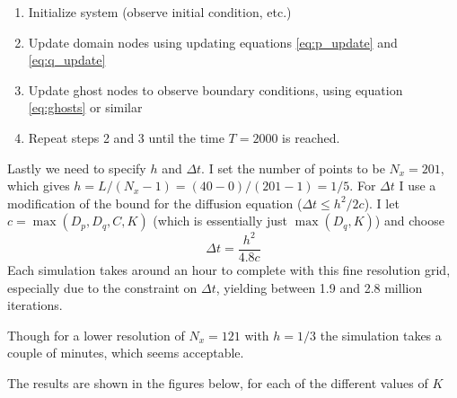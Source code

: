 \documentclass[a4paper,10pt]{article}
\begin{document}
	\begin{enumerate}
		\item Initialize system (observe initial condition, etc.)
		\item Update domain nodes using updating equations \ref{eq:p_update} and \ref{eq:q_update}
		\item Update ghost nodes to observe boundary conditions, using equation \ref{eq:ghosts} or similar
		\item Repeat steps 2 and 3 until the time $ T=2000 $ is reached.
	\end{enumerate}
	Lastly we need to specify $ h $ and $ \Delta t $. I set the number of points to be $ N_x=201 $, which gives $ h = L/(N_x-1) = (40-0)/(201-1) =  1/5 $. For $ \Delta t $ I use a modification of the bound for the diffusion equation ($ \Delta t \leq h^2/2c $). I let $ c = \max (D_p, D_q, C, K) $ (which is essentially just $ \max(D_q, K) $) and choose
	\begin{equation}\label{key}
		\Delta t = \frac{h^2}{4.8c}
	\end{equation}
	Each simulation takes around an hour to complete with this fine resolution grid, especially due to the constraint on $ \Delta t $, yielding between 1.9 and 2.8 million iterations.
	
	Though for a lower resolution of $ N_x = 121 $ with $ h = 1/3 $ the simulation takes a couple of minutes, which seems acceptable.
	
	The results are shown in the figures below, for each of the different values of $ K $
	
\end{document}
